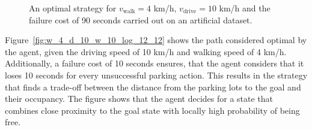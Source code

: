 \begin{figure}[t]
\begin{center}
\end{center}
\caption{An optimal strategy for $v_{\mathrm{walk}} = 4$ km/h, $v_{\mathrm{drive}} = 10$ km/h and the failure cost of 90 seconds carried out on an artificial dataset.}
\label{fig:w_4_d_10_w_90_artificial}
\end{figure}

Figure~\ref{fig:w_4_d_10_w_10_log_12_12} shows the path considered optimal by
the agent, given the driving speed of 10 km/h and walking speed of 4 km/h.
Additionally, a failure cost of 10 seconds ensures, that the agent considers
that it loses 10 seconds for every unsuccessful parking action. This results
in the strategy that finds a trade-off between the distance from the parking
lots to the goal and their occupancy. The figure shows that the agent decides
for a state that combines close proximity to the goal state with locally high
probability of being free.

\begin{figure}[t]
\begin{center}
\hspace{6mm}
\end{center}
\caption{}
\label{fig:long_wait_fast_walk}
\end{figure}

